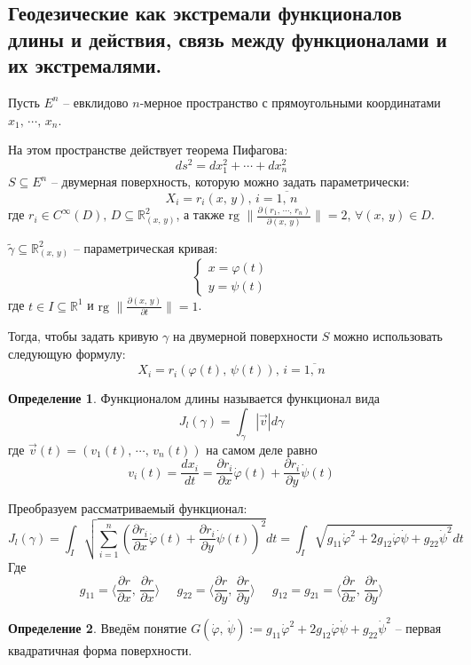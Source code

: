 \documentclass[a4paper,12pt]{article}
\renewcommand{\phi}{\ensuremath{\varphi}}
\theoremstyle{plain}
\theoremstyle{definition}
\newtheorem{definition}{Определение}[section]
\theoremstyle{remark}
\begin{document}
\subsection{Геодезические как экстремали функционалов длины и действия, связь между функционалами и их экстремалями.}
Пусть $E^n$ -- евклидово $n$-мерное пространство с прямоугольными координатами $x_1,\,\cdots,\,x_n$.

На этом пространстве действует теорема Пифагова:
\[ds^2 = dx_1^2 + \cdots + dx_n^2\]
$S \subseteq E^n$ -- двумерная поверхность, которую можно задать параметрически:
\[X_i = r_i(x,\,y),\, i = \overline{1,\,n}\]
где $r_i \in C^\infty(D),\, D \subseteq \mathbb{R}^2_{(x,\,y)}$, а также $\text{rg }\|\frac{\partial(r_1,\,\cdots,\,r_n)}{\partial(x,\,y)}\| = 2,\, \forall (x,\, y) \in D$.

$\tilde{\gamma} \subseteq \mathbb{R}^2_{(x,\,y)}$ -- параметрическая кривая:
\[
	\begin{cases}
		x = \phi(t) \\
		y = \psi(t)
	\end{cases}
\]
где $t \in I \subseteq \mathbb{R}^1$ и $\text{rg }\|\frac{\partial(x,\,y)}{\partial t}\| = 1$.

Тогда, чтобы задать кривую $\gamma$ на двумерной поверхности $S$ можно использовать следующую формулу:
\[X_i = r_i(\phi(t),\,\psi(t)),\, i = \overline{1,\,n}\]

\begin{definition}
	Функционалом длины называется функционал вида
	\[J_l(\gamma) = \int_\gamma |\vec{v}|d\gamma\]
	где $\vec{v}(t) = (v_1(t),\,\cdots,\,v_n(t))$ на самом деле равно
	\[v_i(t) = \frac{dx_i}{dt} = \frac{\partial r_i}{\partial x}\dot{\phi}(t) + \frac{\partial r_i}{\partial y}\dot{\psi}(t)\]
\end{definition}

Преобразуем рассматриваемый функционал:
\[J_l(\gamma) = \int_I\sqrt{\sum_{i = 1}^n \left(\frac{\partial r_i}{\partial x}\dot{\phi}(t) + \frac{\partial r_i}{\partial y}\dot{\psi}(t)\right)^2} dt = \int_I \sqrt{g_{11}\dot{\phi}^2 + 2g_{12}\dot{\phi}\dot{\psi} + g_{22}\dot{\psi}^2}dt\]
Где
\[g_{11} = \langle\frac{\partial r}{\partial x},\, \frac{\partial r}{\partial x}\rangle\;\;\;\;\; g_{22} = \langle \frac{\partial r}{\partial y},\, \frac{\partial r}{\partial y}\rangle\;\;\;\;\; g_{12} = g_{21} = \langle\frac{\partial r}{\partial x},\, \frac{\partial r}{\partial y}\rangle\]

\begin{definition}
	Введём понятие $G(\dot{\phi},\,\dot{\psi}) := g_{11}\dot{\phi}^2 + 2g_{12}\dot{\phi}\dot{\psi} + g_{22}\dot{\psi}^2$ -- первая квадратичная форма поверхности.
\end{definition}
\end{document}
